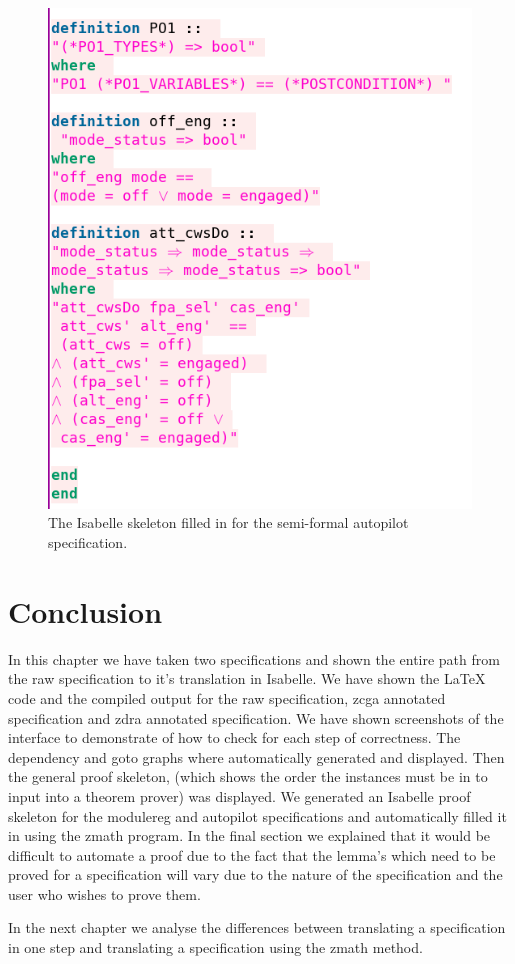 \begin{figure}[H]
\begin{minipage}{0.45\textwidth}
     \includegraphics[width=\linewidth]{Figures/fullexample/sfisabellefill2.png}
     \end{minipage}
     \caption{The Isabelle skeleton filled in for the semi-formal autopilot specification. \label{fig:sfisabelleskeletonfill}}
\end{figure}

\section{Conclusion}
In this chapter we have taken two specifications and shown the entire path
from the raw specification to it's translation in Isabelle. We have shown the
\LaTeX{} code and the compiled output for the raw specification, \gls{zcga}
annotated specification and \gls{zdra} annotated specification. We have shown
screenshots of the interface to demonstrate of how to check for each step of
correctness. The dependency and goto graphs where automatically generated and
displayed. Then the general proof skeleton, (which shows the order the instances
must be in to input into a theorem prover) was displayed. We generated an
Isabelle proof skeleton for the modulereg and autopilot specifications and automatically filled it in
using the \gls{zmath} program. In the final section we explained that it would
be difficult to automate a proof due to the fact that the lemma's which need to
be proved for a specification will vary due to the nature of the specification
and the user who wishes to prove them. 

In the next chapter we analyse the differences between translating a
specification in one step and translating a specification using the \gls{zmath}
method.